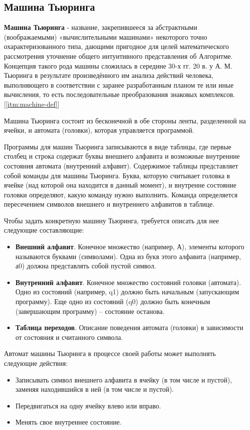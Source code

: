 \documentclass{article}
\begin{document}
\subsection{Машина Тьюринга}
\textbf{Машина Тьюринга} - название, закрепившееся за абстрактными (воображаемыми) 
«вычислительными машинами» некоторого точно охарактеризованного типа, дающими 
пригодное для целей математического рассмотрения уточнение общего интуитивного 
представления об Алгоритме. Концепция такого рода машины сложилась в середине 
30-х гг. 20 в. у А. М. Тьюринга в результате произведённого им анализа действий 
человека, выполняющего в соответствии с заранее разработанным планом те или иные 
вычисления, то есть последовательные преобразования знаковых комплексов.[\ref{itm:machine-def}]

Машина Тьюринга состоит из бесконечной в обе стороны ленты, разделенной на
ячейки, и автомата (головки), которая управляется программой.

Программы для машин Тьюринга записываются в виде таблицы, где первые столбец
и строка содержат буквы внешнего алфавита и возможные внутренние состояния 
автомата (внутренний алфавит). Содержимое таблицы представляет собой команды 
для машины Тьюринга. Буква, которую считывает головка в ячейке (над которой она 
находится в данный момент), и внутренне состояние головки определяют, какую 
команду нужно выполнить. Команда определяется пересечением символов внешнего 
и внутреннего алфавитов в таблице.

Чтобы задать конкретную машину Тьюринга, требуется описать для нее следующие составляющие:
\begin{itemize}
    \item \textbf{Внешний алфавит}. Конечное множество (например, А), элементы которого называются буквами (символами). Одна из букв этого алфавита (например, а0) должна представлять собой пустой символ.
    \item \textbf{Внутренний алфавит}. Конечное множество состояний головки (автомата). Одно из состояний (например, q1) должно быть начальным (запускающим программу). Еще одно из состояний (q0) должно быть конечным (завершающим программу) – состояние останова.
    \item \textbf{Таблица переходов}. Описание поведения автомата (головки) в зависимости от состояния и считанного символа.
\end{itemize}

Автомат машины Тьюринга в процессе своей работы может выполнять следующие действия:
\begin{itemize}
    \item Записывать символ внешнего алфавита в ячейку (в том числе и пустой), заменяя находившийся в ней (в том числе и пустой).
    \item Передвигаться на одну ячейку влево или вправо.
    \item Менять свое внутреннее состояние.
\end{itemize}
\end{document}
